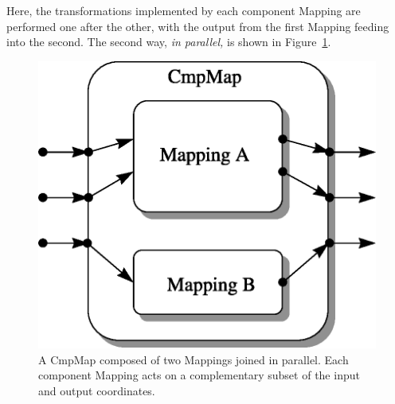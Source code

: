 \documentclass[twoside,11pt]{article}
\newenvironment{latexonly}{}{}
\begin{document}
\begin{latexonly}
   Here, the transformations implemented by each component Mapping are
   performed one after the other, with the output from the first Mapping
   feeding into the second.  The second way, {\em{in parallel,}} is shown in
   Figure~\ref{fig:parallelcmpmap}.
   \begin{figure}
   \begin{center}
   \includegraphics[scale=0.75]{sun210_figures/parallel.eps}
   \caption{A CmpMap composed of two Mappings joined in parallel. Each
   component Mapping acts on a complementary subset of the input and
   output coordinates.}
   \label{fig:parallelcmpmap}
   \end{center}
   \end{figure}
\end{latexonly}
\end{document}

